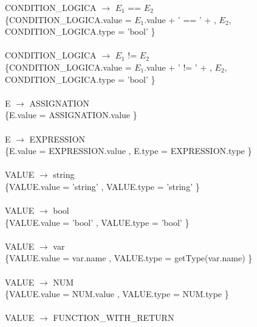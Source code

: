 \documentclass[10pt,a4paper]{article}
\begin{document}
{{{CONDITION\_LOGICA $\rightarrow$ $E_{1}$ == $E_{2}$   \\

\{CONDITION\_LOGICA.value = $E_{1}$.value + ' == ' +  , $E_{2}$,  CONDITION\_LOGICA.type = 'bool' \}  \\ \\

CONDITION\_LOGICA $\rightarrow$ $E_{1}$ != $E_{2}$ \\

\{CONDITION\_LOGICA.value = $E_{1}$.value + ' != ' +  , $E_{2}$,  CONDITION\_LOGICA.type = 'bool' \}  \\ \\


E $\rightarrow$ ASSIGNATION   \\

\{E.value = ASSIGNATION.value  \}  \\ \\

E $\rightarrow$ EXPRESSION \\

\{E.value = EXPRESSION.value  , E.type = EXPRESSION.type \}  \\ \\


VALUE $\rightarrow$ string   \\

\{VALUE.value =  'string' , VALUE.type = 'string' \}  \\ \\


VALUE $\rightarrow$ bool   \\

\{VALUE.value =  'bool' , VALUE.type = 'bool' \}  \\ \\


VALUE $\rightarrow$ var   \\

\{VALUE.value =  var.name , VALUE.type = getType(var.name) \}  \\ \\


VALUE $\rightarrow$ NUM   \\

\{VALUE.value =  NUM.value , VALUE.type = NUM.type \}  \\ \\


VALUE $\rightarrow$ FUNCTION\_WITH\_RETURN \\

}}}
\end{document}
